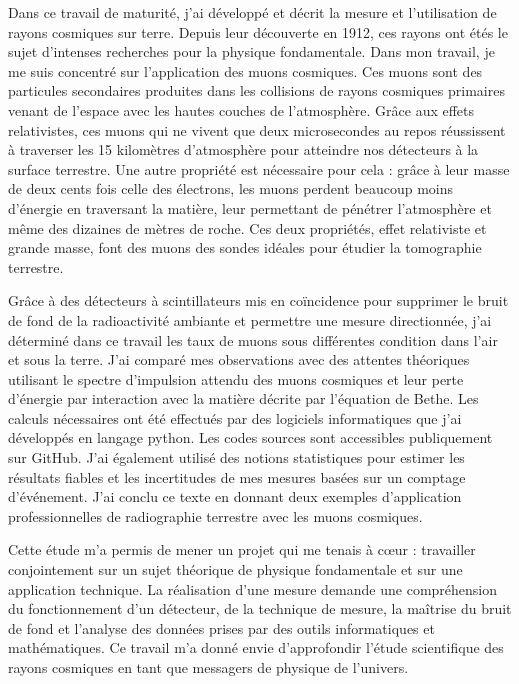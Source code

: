 \documentclass[a4paper, 12pt]{article}
\begin{document}
\begin{spacing}{1.5}
Dans ce travail de maturité, j'ai développé et décrit la mesure et l'utilisation de rayons cosmiques sur terre. Depuis leur découverte en 1912, ces rayons ont étés le sujet d'intenses recherches pour la physique fondamentale. Dans mon travail, je me suis concentré sur l'application des muons cosmiques. Ces muons sont des particules secondaires produites dans les collisions de rayons cosmiques primaires venant de l'espace avec les hautes couches de l'atmosphère. Grâce aux effets relativistes, ces muons qui ne vivent que deux microsecondes au repos réussissent à traverser les 15 kilomètres d'atmosphère pour atteindre nos détecteurs à la surface terrestre. Une autre propriété est nécessaire pour cela : grâce à leur masse de deux cents fois celle des électrons, les muons perdent beaucoup moins d'énergie en traversant la matière, leur permettant de pénétrer l'atmosphère et même des dizaines de mètres de roche. Ces deux propriétés, effet relativiste et grande masse, font des muons des sondes idéales pour étudier la tomographie terrestre. 

Grâce à des détecteurs à scintillateurs mis en coïncidence pour supprimer le bruit de fond de la radioactivité ambiante et permettre une mesure directionnée, j'ai déterminé dans ce travail les taux de muons sous différentes condition dans l'air et sous la terre. J'ai comparé mes observations avec des attentes théoriques utilisant le spectre d'impulsion attendu des muons cosmiques et leur perte d'énergie par interaction avec la matière décrite par l'équation de Bethe. Les calculs nécessaires ont été effectués par des logiciels informatiques que j'ai développés en langage python. Les codes sources sont accessibles publiquement sur GitHub. J'ai également utilisé des notions statistiques pour estimer les résultats fiables et les incertitudes de mes mesures basées sur un comptage d'événement. J'ai conclu ce texte en donnant deux exemples d'application professionnelles de radiographie terrestre avec les muons cosmiques.

Cette étude m'a permis de mener un projet qui me tenais à cœur : travailler conjointement sur un sujet théorique de physique fondamentale et sur une application technique. La réalisation d'une mesure demande une compréhension du fonctionnement d'un détecteur, de la technique de mesure, la maîtrise du bruit de fond et l'analyse des données prises par des outils informatiques et mathématiques. Ce travail m'a donné envie d'approfondir l'étude scientifique des rayons cosmiques en tant que messagers de physique de l'univers.




\end{spacing}
\end{document}
